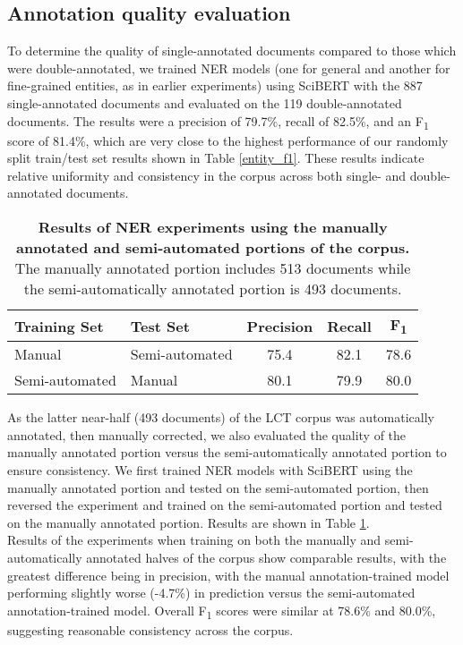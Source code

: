 \documentclass[../main.tex]{subfiles}
\begin{document}
\subsection*{Annotation quality evaluation}
\noident To determine the quality of single-annotated documents compared to those which were double-annotated, we trained NER models (one for general and another for fine-grained entities, as in earlier experiments) using SciBERT with the 887 single-annotated documents and evaluated on the 119 double-annotated documents. The results were a precision of 79.7\%, recall of 82.5\%, and an F\textsubscript{1} score of 81.4\%, which are very close to the highest performance of our randomly split train/test set results shown in Table \ref{entity_f1}. These results indicate relative uniformity and consistency in the corpus across both single- and double-annotated documents. \\

\def\arraystretch{1.2}
\begin{table}[h!]
\centering
\begin{tabular}{l l c c c}
 \toprule
 \textbf{Training Set} & \textbf{Test Set} & \textbf{Precision} & \textbf{Recall} & \textbf{F\textsubscript{1}} \\
 \hline
    Manual & Semi-automated & 75.4 & 82.1 & 78.6 \\
    Semi-automated & Manual & 80.1 & 79.9 & 80.0 \\
 \hline
\end{tabular}
\caption{\textbf{Results of NER experiments using the manually annotated and semi-automated portions of the corpus.} The manually annotated portion includes 513 documents while the semi-automatically annotated portion is 493 documents.}
\label{tbl_manual_semiauto}
\end{table}

\noindent As the latter near-half (493 documents) of the LCT corpus was automatically annotated, then manually corrected, we also evaluated the quality of the manually annotated portion versus the semi-automatically annotated portion to ensure consistency. We first trained NER models with SciBERT using the manually annotated portion and tested on the semi-automated portion, then reversed the experiment and trained on the semi-automated portion and tested on the manually annotated portion. Results are shown in Table \ref{tbl_manual_semiauto}. \\

\noindent Results of the experiments when training on both the manually and semi-automatically annotated halves of the corpus show comparable results, with the greatest difference being in precision, with the manual annotation-trained model performing slightly worse (-4.7\%) in prediction versus the semi-automated annotation-trained model. Overall F\textsubscript{1} scores were similar at 78.6\% and 80.0\%, suggesting reasonable consistency across the corpus.
\end{document}
